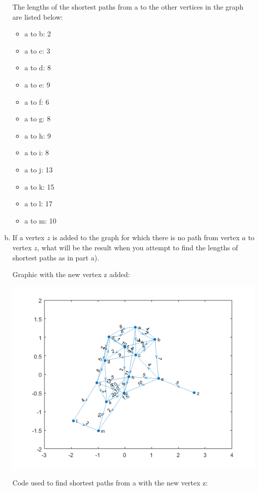 \documentclass[../report/main.tex]{subfiles}
\begin{document}
\begin{enumerate}[a)]
    The lengths of the shortest paths from a to the other vertices in the graph are listed below:
    \begin{itemize}
        \item a to b: 2
        \item a to c: 3
        \item a to d: 8
        \item a to e: 9
        \item a to f: 6
        \item a to g: 8
        \item a to h: 9
        \item a to i: 8
        \item a to j: 13
        \item a to k: 15
        \item a to l: 17
        \item a to m: 10
    \end{itemize}
	\item If a vertex $z$ is added to the graph for which there is no path from vertex $a$ to vertex $z$, what will be the result when you attempt to find the lengths of shortest paths as in part a).

    Graphic with the new vertex z added:

    \includegraphics{../problem_three/problem3_digraph_with_z.png}

    Code used to find shortest paths from a with the new vertex z:
  
    


\end{enumerate}
\end{document}
